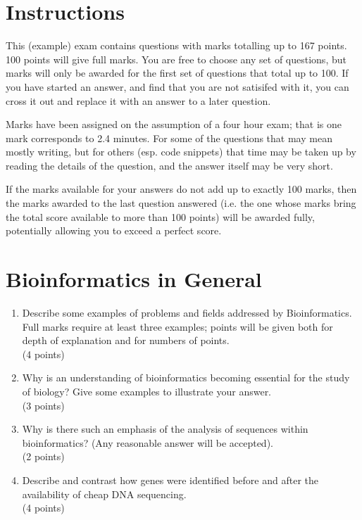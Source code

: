 \documentclass[11pt]{article}
\begin{document}
\section{Instructions}
This (example) exam contains questions with marks totalling up to 167 points.
100 points will give full marks. You are free to choose any set of questions, but
marks will only be awarded for the first set of questions that total up to 100.
If you have started an answer, and find that you are not satisifed with it, you can
cross it out and replace it with an answer to a later question.

Marks have been assigned on the assumption of a four hour exam; that is one mark
corresponds to 2.4 minutes. For some of the questions that may mean mostly
writing, but for others (esp. code snippets) that time may be taken up by
reading the details of the question, and the answer itself may be very short.

If the marks available for your answers do not add up to exactly 100 marks, then the
marks awarded to the last question answered (i.e. the one whose marks bring the total
score available to more than 100 points) will be awarded fully, potentially allowing
you to exceed a perfect score.

\section{Bioinformatics in General}
\begin{enumerate}
\item Describe some examples of problems and fields addressed by
  Bioinformatics. Full marks require at least three examples; points
  will be given both for depth of explanation and for numbers of points.\\
  (4 points)
\item Why is an understanding of bioinformatics becoming essential for
  the study of biology? Give some examples to illustrate your answer.\\
  (3 points)
\item Why is there such an emphasis of the analysis of sequences within
  bioinformatics? (Any reasonable answer will be accepted).\\
  (2 points)
\item Describe and contrast how genes were identified before and after the
  availability of cheap DNA sequencing.\\
  (4 points)
\end{enumerate}
\end{document}
